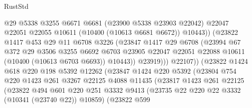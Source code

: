 \begin{lexlean}{RustStd}
\begin{coremodule}
{\begin{coremodule}
{{{{{{{{{{{{{{{{{{{{{{{{{                              @29
                              @5338
                              @3255
                              @6671
                              @6681
                              (@23900 @5338 @23903 @22042)
                              @22047
                              @22051
                              @22055
                              @10611
                              (@10400 (@10613 @6681 @6672))
                              @10443))
                          (@23822
                            @1417
                            @453
                            @29
                            @11
                            @6708
                            @3226
                            (@23847
                              @1417
                              @29
                              @6708
                              (@23994
                                @67
                                @372
                                @29
                                @3506
                                @3255
                                @6692
                                @6703
                                @23905
                                @22047
                                @22051
                                @22088
                                @10611
                                (@10400 (@10613 @6703 @6693))
                                @10443))
                            @23919)))
                      @22107))
                  (@23822
                    @1424
                    @618
                    @220
                    @198
                    @5392
                    @12262
                    (@23847
                      @1424
                      @220
                      @5392
                      (@23804
                        @754
                        @220
                        @1423
                        @261
                        @3267
                        @22125
                        @4088
                        @11435
                        (@23817
                          @1423
                          @261
                          @22125
                          (@23822
                            @494
                            @601
                            @220
                            @251
                            @3332
                            @9413
                            (@23735 @22 @220 @22 @3332 (@10341 (@23740 @22)) @10859)
                            (@23822
                              @599
}}}}}}}}}}}}}}}}}}}}}}}}}
\end{coremodule}}
\end{coremodule}
\end{lexlean}
